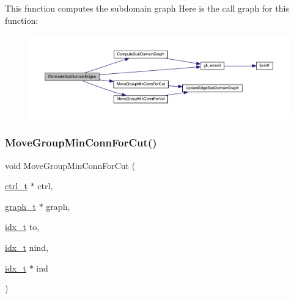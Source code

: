 This function computes the subdomain graph Here is the call graph for this function\+:\nopagebreak
\begin{figure}[H]
\begin{center}
\leavevmode
\includegraphics[width=350pt]{a00242_a6dab60a85abb88ada807831e84cb84fc_cgraph}
\end{center}
\end{figure}
\mbox{\label{a00242_a39d997df18cf07ea8609a66db133a8b6}} 
\subsubsection{\texorpdfstring{Move\+Group\+Min\+Conn\+For\+Cut()}{MoveGroupMinConnForCut()}}
{\footnotesize\ttfamily void Move\+Group\+Min\+Conn\+For\+Cut (\begin{DoxyParamCaption}\item[{\hyperlink{a00742}{ctrl\+\_\+t} $\ast$}]{ctrl,  }\item[{\hyperlink{a00734}{graph\+\_\+t} $\ast$}]{graph,  }\item[{\hyperlink{a00876_aaa5262be3e700770163401acb0150f52}{idx\+\_\+t}}]{to,  }\item[{\hyperlink{a00876_aaa5262be3e700770163401acb0150f52}{idx\+\_\+t}}]{nind,  }\item[{\hyperlink{a00876_aaa5262be3e700770163401acb0150f52}{idx\+\_\+t} $\ast$}]{ind }\end{DoxyParamCaption})}

